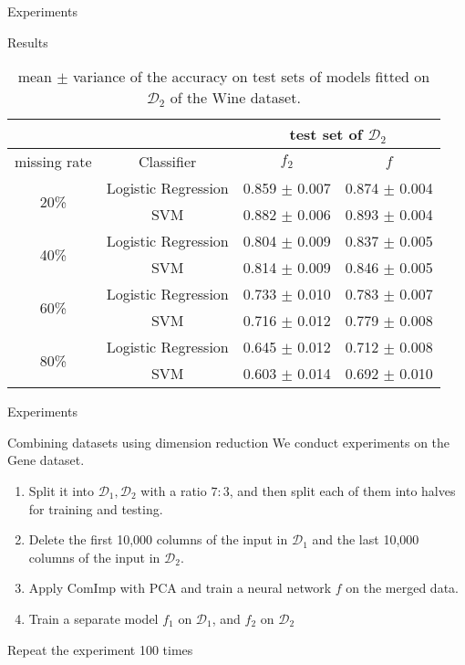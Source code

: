 \documentclass[xcolor={dvipsnames}]{beamer} %
\begin{document}
\begin{frame}{Experiments}
    \begin{block}{Results}
        \begin{table}[htbp]
        \caption{mean $\pm$ variance of the accuracy on test sets of  models fitted on $\mathcal{D}_2$ of the Wine dataset.}
\label{tab-imputation}
\begin{center}
\small
\begin{tabular}{|c|c|c|c|}

\hline
\multicolumn{2}{|c|}{} &\multicolumn{2}{|c|}{\bf test set of $\mathcal{D}_2$}
\\ \hline 
\multicolumn{1}{|c|}{missing rate}&\multicolumn{1}{|c|}{Classifier}&\multicolumn{1}{|c|}{\bf ${f}_2$} &\multicolumn{1}{|c|}{\bf ${f}$}
\\ \hline 
\multirow{2}{*}{20\%}&Logistic Regression & 0.859 $\pm$ 0.007& 0.874 $\pm$ 0.004\\ \cline{2-4}
&SVM & 0.882 $\pm$ 0.006& 0.893 $\pm$ 0.004\\\hline
\multirow{2}{*}{40\%}&Logistic Regression  & 0.804 $\pm$ 0.009& 0.837 $\pm$ 0.005\\ \cline{2-4}
&SVM & 0.814 $\pm$ 0.009& 0.846 $\pm$ 0.005\\ \hline
\multirow{2}{*}{60\%}&Logistic Regression & 0.733 $\pm$ 0.010& 0.783 $\pm$ 0.007\\ \cline{2-4}
&SVM & 0.716 $\pm$ 0.012 & 0.779 $\pm$ 0.008\\\hline
\multirow{2}{*}{80\%}&Logistic Regression & 0.645 $\pm$ 0.012& 0.712 $\pm$ 0.008\\ \cline{2-4}
&SVM & 0.603 $\pm$ 0.014& 0.692 $\pm$ 0.010\\\hline
\end{tabular}
\end{center}
        \end{table}
    \end{block}
\end{frame}

\begin{frame}{Experiments}
\begin{block}{Combining datasets using dimension reduction}
 We conduct experiments on the Gene dataset. 
 \begin{enumerate}
     \item Split it into $\mathcal{D}_1, \mathcal{D}_2$ with a ratio $7:3$, and then split each of them into halves for training and testing.
     \item Delete the first 10,000 columns of the input in $\mathcal{D}_1$ and the last 10,000 columns of the input in $\mathcal{D}_2$.
     \item Apply ComImp with PCA and train a neural network $f$ on the merged data.
     \item Train a separate model $f_1$ on $\mathcal{D}_1$, and $f_2$ on $\mathcal{D}_2$
 \end{enumerate}
 Repeat the experiment 100 times
\end{block}
\end{frame}
\end{document}
